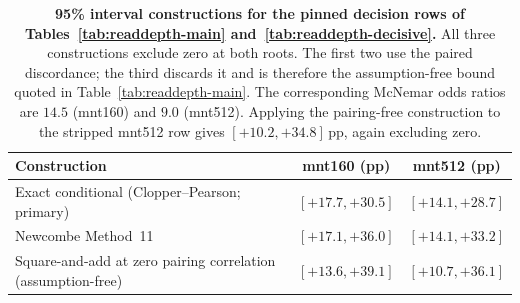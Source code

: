 \begin{table}[H]
\centering
\small
\setlength{\tabcolsep}{6pt}
\begin{tabular}{@{}lcc@{}}
\toprule
\textbf{Construction} & \textbf{mnt160} (pp) & \textbf{mnt512} (pp) \\
\midrule
Exact conditional (Clopper--Pearson; primary) & $[+17.7,+30.5]$ & $[+14.1,+28.7]$ \\
Newcombe Method~11~\citep{newcombe1998} & $[+17.1,+36.0]$ & $[+14.1,+33.2]$ \\
Square-and-add at zero pairing correlation (assumption-free) & $[+13.6,+39.1]$ & $[+10.7,+36.1]$ \\
\bottomrule
\end{tabular}
\caption{\textbf{95\% interval constructions for the pinned decision rows of
Tables~\ref{tab:readdepth-main} and~\ref{tab:readdepth-decisive}.}  All three
constructions exclude zero at both roots.  The first two use the paired
discordance; the third discards it and is therefore the assumption-free bound
quoted in Table~\ref{tab:readdepth-main}.  The corresponding McNemar odds ratios
are $14.5$ (mnt160) and $9.0$ (mnt512).  Applying the pairing-free construction
to the stripped mnt512 row gives $[+10.2,+34.8]$\,pp, again excluding zero.}
\label{tab:paired-cis}
\end{table}
